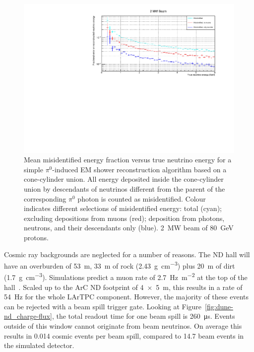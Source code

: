 \documentclass[a4paper]{article}
\begin{document}
\begin{figure}[tbp]
	\centering
	\includegraphics[width=\textwidth]{Figures/2MW/misid_rel_x}
	\caption[Pile-up study mean misidentified fractional vs.\ true neutrino energy, \SI{2}{\mega\watt} beam]{%
		Mean misidentified energy fraction versus true neutrino energy for a simple $\pi^0$-induced EM shower reconstruction algorithm based on a cone-cylinder union.
		All energy deposited inside the cone-cylinder union by descendants of neutrinos different from the parent of the corresponding $\pi^0$ photon is counted as misidentified.
		Colour indicates different selections of misidentified energy: total (cyan); excluding depositions from muons (red); deposition from photons, neutrons, and their descendants only (blue).
		\SI{2}{\mega\watt} beam of \SI{80}{\giga\electronvolt} protons.
	}
	\label{fig:dune-nd_2MW_misid-rel-x}
\end{figure}

Cosmic ray backgrounds are neglected for a number of reasons.
The ND hall will have an overburden of \SI{53}{\metre}, \SI{33}{\metre} of rock (\SI{2.43}{\gram\per\centi\metre\cubed}) plus \SI{20}{\metre} of dirt (\SI{1.7}{\gram\per\centi\metre\cubed}).
Simulations predict a muon rate of \SI{2.7}{\hertz\per\metre\squared} at the top of the hall~\cite{dune_ndtfr}.
Scaled up to the ArC ND footprint of \SI{4 x 5}{\metre}, this results in a rate of \SI{54}{\hertz} for the whole LArTPC component.
However, the majority of these events can be rejected with a beam spill trigger gate.
Looking at Figure~\ref{fig:dune-nd_charge-flux}, the total readout time for one beam spill is \SI{260}{\micro\second}.
Events outside of this window cannot originate from beam neutrinos.
On average this results in \num{0.014} cosmic events per beam spill, compared to \num{14.7} beam events in the simulated detector.
\end{document}
